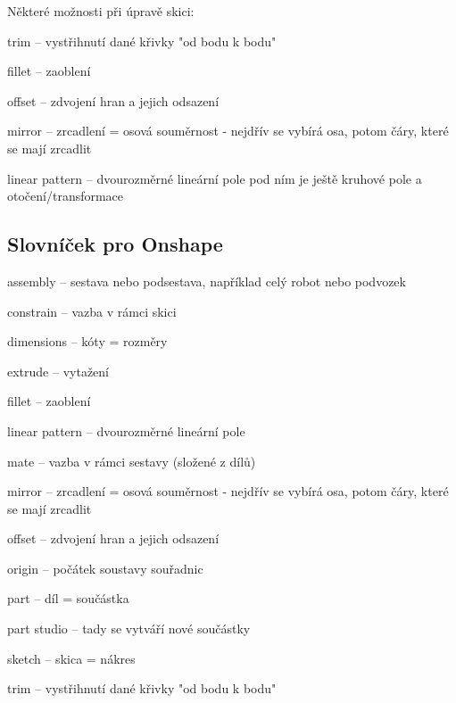 Některé možnosti při úpravě skici: 

trim -- vystřihnutí dané křivky "od bodu k bodu"

fillet -- zaoblení 

offset -- zdvojení hran a jejich odsazení 

mirror -- zrcadlení = osová souměrnost - nejdřív se vybírá osa, potom čáry, které se mají zrcadlit

linear pattern -- dvourozměrné lineární pole 
pod ním je ještě kruhové pole a otočení/transformace 


\subsection{Slovníček pro Onshape}

assembly -- sestava nebo podsestava, například celý robot nebo podvozek

constrain -- vazba v rámci skici

dimensions -- kóty = rozměry 

extrude -- vytažení 

fillet -- zaoblení 

linear pattern -- dvourozměrné lineární pole 

mate -- vazba v rámci sestavy (složené z dílů)

mirror -- zrcadlení = osová souměrnost - nejdřív se vybírá osa, potom čáry, které se mají zrcadlit

offset -- zdvojení hran a jejich odsazení 

origin -- počátek soustavy souřadnic

part -- díl = součástka

part studio -- tady se vytváří nové součástky 

sketch -- skica = nákres 

trim -- vystřihnutí dané křivky "od bodu k bodu"







